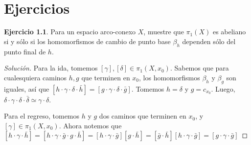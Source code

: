 \documentclass[spanish]{book}
\theoremstyle{definition}
\newtheorem*{ejer}{Ejercicio}
\begin{document}
\chapter{Ejercicios}

\begin{ejer}
	Para un espacio arco-conexo $X$, muestre que $\pi_1(X)$ es abeliano si y sólo si los homomorfismos de cambio de punto base $\beta_h$ dependen sólo del punto final de $h$.
\end{ejer}
\begin{proof}[Solución]
	Para la ida, tomemos $[\gamma],[\delta]\in\pi_1(X,x_0)$. Sabemos que para cualesquiera caminos $h,g$ que terminen en $x_0$, los homomorfismos $\beta_h$ y $\beta_g$ son iguales, así que $[h\cdot \gamma\cdot\delta\cdot\bar{h}]=[g\cdot\gamma\cdot\delta\cdot\bar{g}]$. Tomemos $h=\delta$ y $g=c_{x_0}$. Luego, $\delta\cdot\gamma\cdot\delta\cdot\bar{\delta}\simeq\gamma\cdot\delta$.
	
	Para el regreso, tomemos $h$ y $g$ dos caminos que terminen en $x_0$, y $[\gamma]\in\pi_1(X,x_0)$. Ahora notemos que $[h\cdot\gamma\cdot\bar{h}]=[h\cdot\gamma\cdot \bar{g}\cdot g\cdot\bar{h}]=[h\cdot\gamma\cdot \bar{g}][g\cdot\bar{h}]=[\bar{g}\cdot\bar{h}][h\cdot\gamma\cdot \bar{g}]=[g\cdot\gamma\cdot \bar{g}]$
\end{proof}
\end{document}
